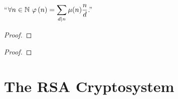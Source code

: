         \begin{theorem}
            ``$\forall n \in \mathbb{N} \ \varphi\left(n\right) = \displaystyle\sum_{d \mid n} \mu(n) \frac{n}{d}$.''
        \end{theorem}
        \begin{proof}
        \end{proof}
        \begin{theorem}
        \end{theorem}
        \begin{proof}
        \end{proof}
    \section{The RSA Cryptosystem}
